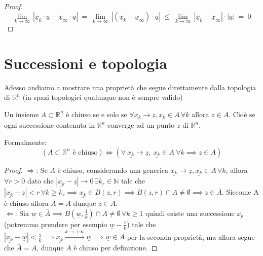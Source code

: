 \begin{proof}
	\[ \lim_{k\rightarrow\infty}\, |\underline x_k\cdot\underline a - \underline x_\infty\cdot\underline a|\ =\ \lim_{k\rightarrow\infty}\, |(\underline x_k - \underline x_\infty) \cdot\underline a|\ \leq\ \lim_{k\rightarrow\infty}\, |\underline x_k - \underline x_\infty|\cdot |\underline a|\ =\ 0 \]
\end{proof}


%
%
%
\vspace{0.5cm}
\section{Successioni e topologia}

\noindent Adesso andiamo a mostrare una proprietà che segue direttamente dalla topologia di $\mathbb{R}^n$ (in spazi topologici qualunque non è sempre valido)

\begin{prop}[\textcolor{blue}{caratterizzazione degli insiemi chiusi}]
	Un insieme $A \subset \mathbb{R}^n$ è chiuso se e solo se $\forall \underline{x_k} \to \underline{z}, \underline{x_k} \in A \, \forall k$ allora $z \in A$. Cioè se ogni successione contenuta in $\mathbb{R}^n$ converge ad un punto $\underline z$ di $\mathbb{R}^n$. 
	
	Formalmente:
	$$
	(A \subset \mathbb{R}^n \text{ è chiuso}) \iff (\forall\ \underline{x_k} \to \underline{z},\ \underline{x_k} \in A \ \forall k \implies z \in A) 
	$$
	\label{prop:caratt_chiusi}
\end{prop}

\begin{proof} \hspace{1em} \newline
$\boxed{\Rightarrow}$: Se $A$ è chiuso, considerando una generica $\underline{x_k} \to \underline{z}, \underline{x_k} \in A \, \forall k$, allora $\forall r > 0$ dato che $|\underline{x_k} - \underline{z}| \to 0 \, \exists k_r \in \mathbb{N}$ tale che $|\underline{x_k} - \underline{z}| < r \, \forall k \geq k_r \implies \underline{x_k} \in B(z, r) \implies B(z, r) \cap A \neq \emptyset \implies z \in \bar{A}$. Siccome A è chiuso allora $\bar{A} = A$ dunque $z \in A$. \\
$\boxed{\Leftarrow}$: Sia $\underline{w} \in \bar{A} \implies B(\underline{w}, \frac{1}{k}) \cap A \neq \emptyset \, \forall k \geq 1$ quindi esiste una successione $\underline{x_k}$ (potremmo prendere per esempio $\underline{w}-\frac{1}{k}$) tale che $|\underline{x_k} - \underline{w}| < \frac{1}{k} \implies \underline{x_k} \stackrel{k \to +\infty}{\to} \underline{w} \implies \underline{w} \in A$ per la seconda proprietà, ma allora segue che $\bar{A} = A$, dunque $A$ è chiuso per definizione. 
\end{proof}

